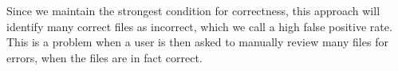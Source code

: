 Since we maintain the strongest condition for correctness, this approach will identify many correct files as incorrect, which we call a high false positive rate.
This is a problem when a user is then asked to manually review many files for errors, when the files are in fact correct.


